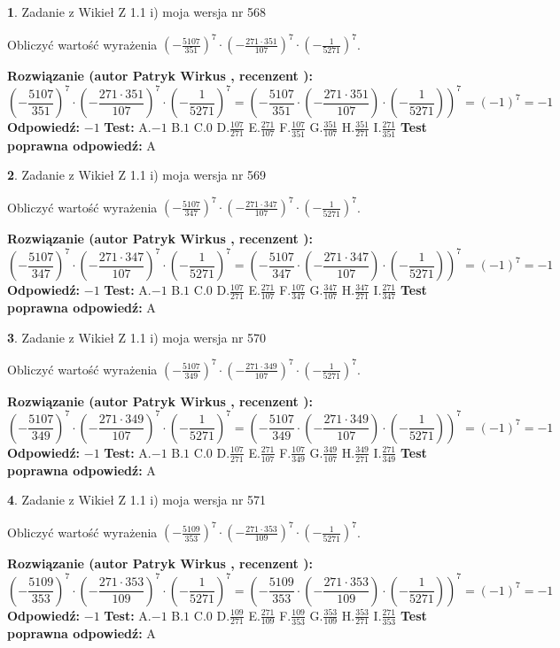 \documentclass[12pt, a4paper]{article}
\theoremstyle{definition} %
\newtheorem{zad}{}
\newcommand{\zadStart}[1]{\begin{zad}#1\newline}
\newcommand{\zadStop}{\end{zad}}
\newcommand{\rozwStart}[2]{\noindent \textbf{Rozwiązanie (autor #1 , recenzent #2): }\newline}
\newcommand{\rozwStop}{\newline}
\newcommand{\odpStart}{\noindent \textbf{Odpowiedź:}\newline}
\newcommand{\odpStop}{\newline}
\newcommand{\testStart}{\noindent \textbf{Test:}\newline}
\newcommand{\testStop}{\newline}
\newcommand{\kluczStart}{\noindent \textbf{Test poprawna odpowiedź:}\newline}
\newcommand{\kluczStop}{\newline}
\begin{document}
\zadStart{Zadanie z Wikieł Z 1.1 i) moja wersja nr 568}

Obliczyć wartość wyrażenia $(-\frac{5107}{351})^{7} \cdot (-\frac{271 \cdot 351}{107})^{7} \cdot (-\frac{1}{5271})^{7}$.
\zadStop
\rozwStart{Patryk Wirkus}{}
$$(-\frac{5107}{351})^{7} \cdot (-\frac{271 \cdot 351}{107})^{7} \cdot (-\frac{1}{5271})^{7} = (-\frac{5107}{351} \cdot (-\frac{271 \cdot 351}{107}) \cdot (-\frac{1}{5271}))^{7} = (-1)^{7} = -1$$
\rozwStop
\odpStart
$-1$
\odpStop
\testStart
A.$-1$ B.$1$ C.$0$ D.$\frac{107}{271}$ E.$\frac{271}{107}$
F.$\frac{107}{351}$ G.$\frac{351}{107}$
H.$\frac{351}{271}$
I.$\frac{271}{351}$
\testStop
\kluczStart
A
\kluczStop



\zadStart{Zadanie z Wikieł Z 1.1 i) moja wersja nr 569}

Obliczyć wartość wyrażenia $(-\frac{5107}{347})^{7} \cdot (-\frac{271 \cdot 347}{107})^{7} \cdot (-\frac{1}{5271})^{7}$.
\zadStop
\rozwStart{Patryk Wirkus}{}
$$(-\frac{5107}{347})^{7} \cdot (-\frac{271 \cdot 347}{107})^{7} \cdot (-\frac{1}{5271})^{7} = (-\frac{5107}{347} \cdot (-\frac{271 \cdot 347}{107}) \cdot (-\frac{1}{5271}))^{7} = (-1)^{7} = -1$$
\rozwStop
\odpStart
$-1$
\odpStop
\testStart
A.$-1$ B.$1$ C.$0$ D.$\frac{107}{271}$ E.$\frac{271}{107}$
F.$\frac{107}{347}$ G.$\frac{347}{107}$
H.$\frac{347}{271}$
I.$\frac{271}{347}$
\testStop
\kluczStart
A
\kluczStop



\zadStart{Zadanie z Wikieł Z 1.1 i) moja wersja nr 570}

Obliczyć wartość wyrażenia $(-\frac{5107}{349})^{7} \cdot (-\frac{271 \cdot 349}{107})^{7} \cdot (-\frac{1}{5271})^{7}$.
\zadStop
\rozwStart{Patryk Wirkus}{}
$$(-\frac{5107}{349})^{7} \cdot (-\frac{271 \cdot 349}{107})^{7} \cdot (-\frac{1}{5271})^{7} = (-\frac{5107}{349} \cdot (-\frac{271 \cdot 349}{107}) \cdot (-\frac{1}{5271}))^{7} = (-1)^{7} = -1$$
\rozwStop
\odpStart
$-1$
\odpStop
\testStart
A.$-1$ B.$1$ C.$0$ D.$\frac{107}{271}$ E.$\frac{271}{107}$
F.$\frac{107}{349}$ G.$\frac{349}{107}$
H.$\frac{349}{271}$
I.$\frac{271}{349}$
\testStop
\kluczStart
A
\kluczStop



\zadStart{Zadanie z Wikieł Z 1.1 i) moja wersja nr 571}

Obliczyć wartość wyrażenia $(-\frac{5109}{353})^{7} \cdot (-\frac{271 \cdot 353}{109})^{7} \cdot (-\frac{1}{5271})^{7}$.
\zadStop
\rozwStart{Patryk Wirkus}{}
$$(-\frac{5109}{353})^{7} \cdot (-\frac{271 \cdot 353}{109})^{7} \cdot (-\frac{1}{5271})^{7} = (-\frac{5109}{353} \cdot (-\frac{271 \cdot 353}{109}) \cdot (-\frac{1}{5271}))^{7} = (-1)^{7} = -1$$
\rozwStop
\odpStart
$-1$
\odpStop
\testStart
A.$-1$ B.$1$ C.$0$ D.$\frac{109}{271}$ E.$\frac{271}{109}$
F.$\frac{109}{353}$ G.$\frac{353}{109}$
H.$\frac{353}{271}$
I.$\frac{271}{353}$
\testStop
\kluczStart
A
\kluczStop
\end{document}
